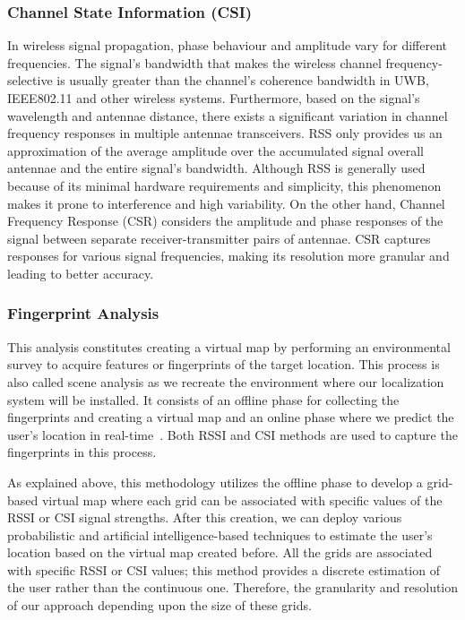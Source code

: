 \documentclass[a4paper,singleside,12pt]{report} %
\begin{document}
				\subsubsection{Channel State Information (CSI)}
					In wireless signal propagation, phase behaviour and amplitude vary for different frequencies. 
					The signal's bandwidth that makes the wireless channel frequency-selective is usually greater than the channel's coherence bandwidth in UWB, IEEE802.11 and other wireless systems. 
					Furthermore, based on the signal's wavelength and antennae distance, there exists a significant variation in channel frequency responses in multiple antennae transceivers. 
					RSS only provides us an approximation of the average amplitude over the accumulated signal overall antennae and the entire signal's bandwidth. 
					Although RSS is generally used because of its minimal hardware requirements and simplicity, this phenomenon makes it prone to interference and high variability. 
					On the other hand, Channel Frequency Response (CSR) considers the amplitude and phase responses of the signal between separate receiver-transmitter pairs of antennae. 
					CSR captures responses for various signal frequencies, making its resolution more granular and leading to better accuracy.  

				\subsubsection{Fingerprint Analysis}
					This analysis constitutes creating a virtual map by performing an environmental survey to acquire features or fingerprints of the target location. 
					This process is also called scene analysis as we recreate the environment where our localization system will be installed. 
					It consists of an offline phase for collecting the fingerprints and creating a virtual map and an online phase where we predict the user's location in real-time~\cite{youssef2005horus, zafari2015microlocation}. 
					Both RSSI and CSI methods are used to capture the fingerprints in this process. 

					As explained above, this methodology utilizes the offline phase to develop a grid-based virtual map where each grid can be associated with specific values of the RSSI or CSI signal strengths. 
					After this creation, we can deploy various probabilistic and artificial intelligence-based techniques to estimate the user's location based on the virtual map created before. 
					All the grids are associated with specific RSSI or CSI values; this method provides a discrete estimation of the user rather than the continuous one. 
					Therefore, the granularity and resolution of our approach depending upon the size of these grids. 
					
\end{document}
